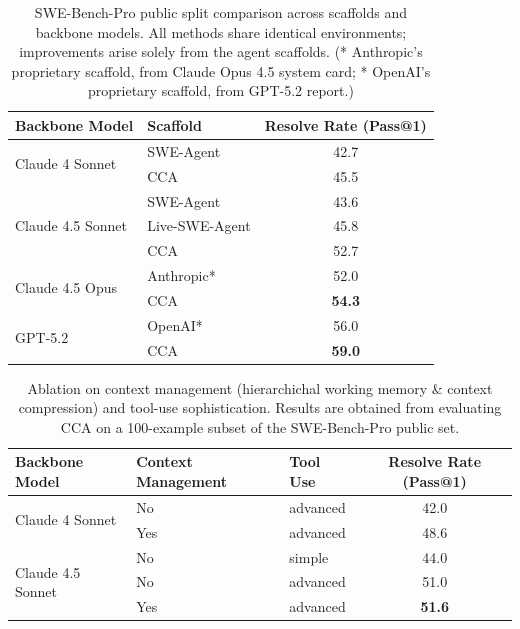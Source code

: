 \begin{table}[h]
\centering
\begin{tabular}{l l c}
\toprule
\textbf{Backbone Model} & \textbf{Scaffold} & \textbf{Resolve Rate (Pass@1)} \\
\midrule

\multirow{2}{*}{Claude 4 Sonnet}
    & SWE-Agent \citep{sweagent} & 42.7 \\
    & CCA           & 45.5 \\
\midrule

\multirow{3}{*}{Claude 4.5 Sonnet}
    & SWE-Agent  & 43.6 \\
    & Live-SWE-Agent \citep{xia2025live}       & 45.8 \\
    & CCA            & 52.7 \\
\midrule

\multirow{2}{*}{Claude 4.5 Opus}
    & Anthropic*  & 52.0 \\
    & CCA            & \textbf{54.3} \\
\midrule

\multirow{2}{*}{GPT-5.2}
    & OpenAI* & 56.0 \\
    & CCA     & \textbf{59.0} \\
\bottomrule
\end{tabular}
\caption{SWE-Bench-Pro public split comparison across scaffolds and backbone models.
All methods share identical environments; improvements arise solely from the agent scaffolds.
(* Anthropic's proprietary scaffold, from Claude Opus 4.5 system card; * OpenAI's proprietary scaffold, from GPT-5.2 report.)}
\label{tab:swepro}
\end{table}

\begin{table}[t]
\centering
\begin{tabular}{l l l c}
\toprule
\textbf{Backbone Model} & \textbf{Context Management} & \textbf{Tool Use} & \textbf{Resolve Rate (Pass@1)} \\
\midrule

\multirow{2}{*}{Claude 4 Sonnet}
    & No  & advanced & 42.0 \\
    & Yes & advanced & 48.6 \\
\midrule

\multirow{3}{*}{Claude 4.5 Sonnet}
    & No  & simple   & 44.0 \\
    & No  & advanced & 51.0 \\
    & Yes & advanced & \textbf{51.6} \\
\bottomrule
\end{tabular}
\caption{Ablation on context management (hierarchichal working memory \& context compression) and tool-use sophistication. Results are obtained from evaluating CCA on a 100-example subset of the SWE-Bench-Pro public set.}
\label{tab:context_mgmt}
\end{table}


